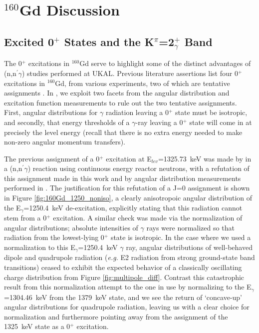 \section{$^{160}$Gd Discussion}



\subsection{Excited 0$^+$ States and the K$^\pi$=2$^+_\gamma$ Band}

The 0$^+$ excitations in $^{160}$Gd serve to highlight some of the distinct advantages of (n,n$^\prime\gamma$) studies performed at UKAL. Previous literature assertions list four 0$^+$ excitations in $^{160}$Gd, from various experiments, two of which are tentative assignments \cite{Berzin_160Gd_reject0,Lovhoiden_160pt}. In \cite{Lesher_160Gd0s}, we exploit two facets from the angular distribution and excitation function measurements to rule out the two tentative assignments. First, angular distributions for $\gamma$ radiation leaving a 0$^+$ state must be isotropic, and secondly, that energy thresholds of a $\gamma$-ray leaving a 0$^+$ state will come in at precisely the level energy (recall that there is no extra energy needed to make non-zero angular momentum transfers). 

The previous assignment of a 0$^+$ excitation at E$_{lev}$=1325.73~keV was made by \cite{Berzin_160Gd_reject0} in a (n,n$^\prime\gamma$) reaction using continuous energy reactor neutrons, with a refutation of this assignment made in this work and by angular distribution measurements performed in \cite{Govor_160Gd_2009}. The justification for this refutation of a J=0 assignment is shown in Figure \ref{fig:160Gd_1250_noniso}, a clearly anisotropoic angular distribution of the E$_\gamma$=1250.4~keV de-excitation, explicitly stating that this radiation cannot stem from a 0$^+$ excitation. A similar check was made via the normalization of angular distributions; absolute intensities of $\gamma$ rays were normalized so that radiation from the lowest-lying 0$^+$ state is isotropic. In the case where we used a normalization to this E$_\gamma$=1250.4~keV $\gamma$ ray, angular distributions of well-behaved dipole and quadrupole radiation (\textit{e.g.} E2 radiation from strong ground-state band transitions) ceased to exhibit the expected behavior of a classically oscillating charge distribution from Figure \ref{fig:multipole_diff}. Contrast this catastrophic result from this normalization attempt to the one in use by normalizing to the E$_\gamma$=1304.46~keV from the 1379~keV state, and we see the return of `concave-up' angular distributions for quadrupole radiation, leaving us with a clear choice for normalization and furthermore pointing away from the assignment of the 1325~keV state as a 0$^+$ excitation.


